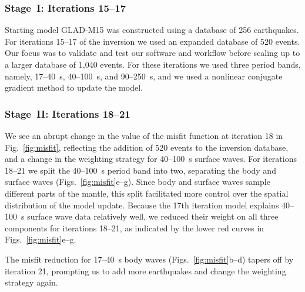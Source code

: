 \documentclass[extra,mreferee]{gji}
\begin{document}
\subsubsection{Stage~I: Iterations 15--17}

Starting model GLAD-M15 was constructed using a database of 256 earthquakes.
For iterations 15--17 of the inversion we used an expanded database of 520 events.
Our focus was to validate and test our software and workflow before scaling up
to a larger database of 1,040 events.
For these iterations we used three period bands, namely,
17--40~s, 40--100~s, and 90--250~s,
and we used a nonlinear conjugate
gradient method to update the model.

\subsubsection{Stage~II: Iterations 18--21}

We see an abrupt change in the value of the misfit function at iteration 18
in Fig.~\ref{fig:misfit},
reflecting the addition of 520 events to the inversion database,
and a change in the weighting strategy for 40--100~s surface waves.
For iterations 18--21 we split the 40--100~s period band into two, separating the body and surface waves (Figs.~\ref{fig:misfit}e--g).
Since body and surface waves sample different parts of the mantle,
this split facilitated more control over the spatial distribution of the model update.
Because the 17th iteration model explains 40--100~s surface wave data relatively well,
we reduced their weight on all three components for iterations 18--21,
as indicated by the lower red curves in Figs.~\ref{fig:misfit}e--g.

The misfit reduction for 17--40~s body waves (Figs.~\ref{fig:misfit}b--d) tapers off by iteration 21, prompting us to add more earthquakes and change the weighting strategy again.


\end{document}
